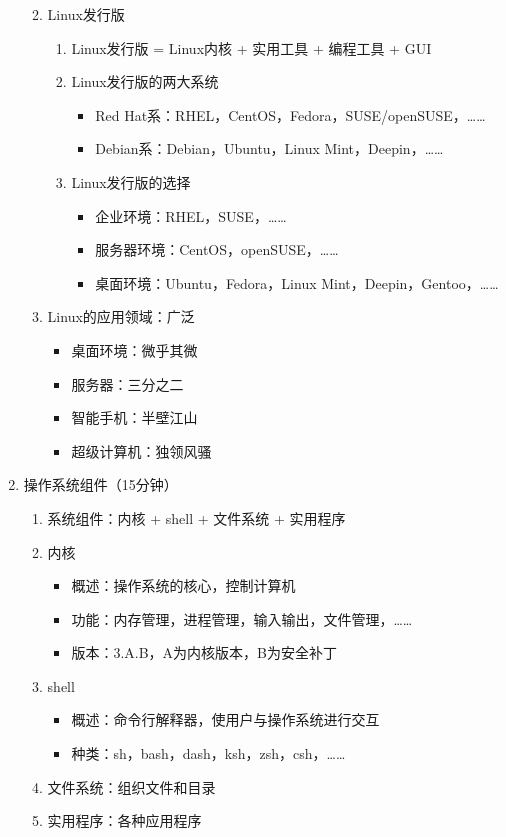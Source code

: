 \documentclass{TIJMUjiaoanLL}
\begin{document}
\begin{enumerate}
\begin{enumerate}
\begin{enumerate}
\begin{itemize}
	    \end{itemize}
	\end{enumerate}
      \item Linux发行版
	\begin{enumerate}
	  \item Linux发行版 = Linux内核 + 实用工具 + 编程工具 + GUI
	  \item Linux发行版的两大系统
	    \begin{itemize}
	      \item Red Hat系：RHEL，CentOS，Fedora，SUSE/openSUSE，……
	      \item Debian系：Debian，Ubuntu，Linux Mint，Deepin，……
	    \end{itemize}
	  \item Linux发行版的选择
	    \begin{itemize}
	      \item 企业环境：RHEL，SUSE，……
	      \item 服务器环境：CentOS，openSUSE，……
	      \item 桌面环境：Ubuntu，Fedora，Linux Mint，Deepin，Gentoo，……
	    \end{itemize}
	\end{enumerate}
      \item Linux的应用领域：广泛
	\begin{itemize}
	  \item 桌面环境：微乎其微
	  \item 服务器：三分之二
	  \item 智能手机：半壁江山
	  \item 超级计算机：独领风骚
	\end{itemize}
    \end{enumerate}

\otherTail
\newpage
\otherHeader

  \item 操作系统组件（15分钟）
    \begin{enumerate}
      \item 系统组件：内核 + shell + 文件系统 + 实用程序
      \item 内核
	\begin{itemize}
	  \item 概述：操作系统的核心，控制计算机
	  \item 功能：内存管理，进程管理，输入输出，文件管理，……
	  \item 版本：3.A.B，A为内核版本，B为安全补丁
	\end{itemize}
      \item shell
	\begin{itemize}
	  \item 概述：命令行解释器，使用户与操作系统进行交互
	  \item 种类：sh，bash，dash，ksh，zsh，csh，……
	\end{itemize}
      \item 文件系统：组织文件和目录
      \item 实用程序：各种应用程序
    \end{enumerate}


\end{enumerate}
\end{document}
